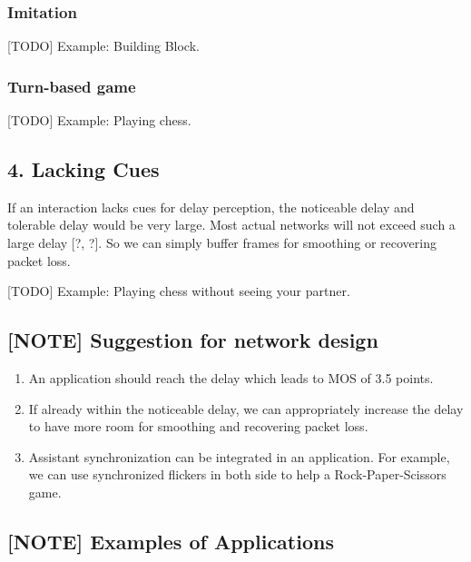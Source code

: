 \subsubsection{Imitation}

[TODO] Example: Building Block.

\subsubsection{Turn-based game}

[TODO] Example: Playing chess.

\subsection{4. Lacking Cues}

If an interaction lacks cues for delay perception, the noticeable delay and tolerable delay would be very large. Most actual networks will not exceed such a large delay \cite{donovan2014understanding} [?, ?]. So we can simply buffer frames for smoothing or recovering packet loss.

[TODO] Example: Playing chess without seeing your partner.

\subsection{[NOTE] Suggestion for network design}

\begin{enumerate}
    \item An application should reach the delay which leads to MOS of 3.5 points.
    \item If already within the noticeable delay, we can appropriately increase the delay to have more room for smoothing and recovering packet loss.
    \item Assistant synchronization can be integrated in an application. For example, we can use synchronized flickers in both side to help a Rock-Paper-Scissors game.
\end{enumerate}

\subsection{[NOTE] Examples of Applications}


